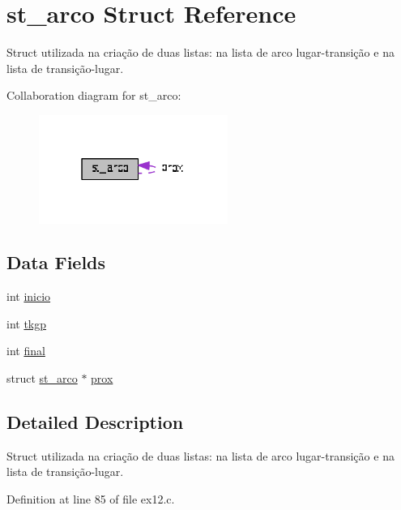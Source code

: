 \hypertarget{structst__arco}{\section{st\+\_\+arco Struct Reference}
\label{structst__arco}
}


Struct utilizada na criação de duas listas\+: na lista de arco lugar-\/transição e na lista de transição-\/lugar.  




Collaboration diagram for st\+\_\+arco\+:\nopagebreak
\begin{figure}[H]
\begin{center}
\leavevmode
\includegraphics[width=175pt]{structst__arco__coll__graph}
\end{center}
\end{figure}
\subsection*{Data Fields}
\begin{DoxyCompactItemize}
\item 
int \hyperlink{structst__arco_a640a8b25b7f08e94cc6e535523aa8857}{inicio}
\item 
int \hyperlink{structst__arco_aa9099d2432e77829a68e2aacea614b57}{tkgp}
\item 
int \hyperlink{structst__arco_a2215b7a64f0bc19a8916059b80a8a7e4}{final}
\item 
struct \hyperlink{structst__arco}{st\+\_\+arco} $\ast$ \hyperlink{structst__arco_a7e122db30f69e19aed8a7ce0295920c0}{prox}
\end{DoxyCompactItemize}


\subsection{Detailed Description}
Struct utilizada na criação de duas listas\+: na lista de arco lugar-\/transição e na lista de transição-\/lugar. 



Definition at line 85 of file ex12.\+c.



